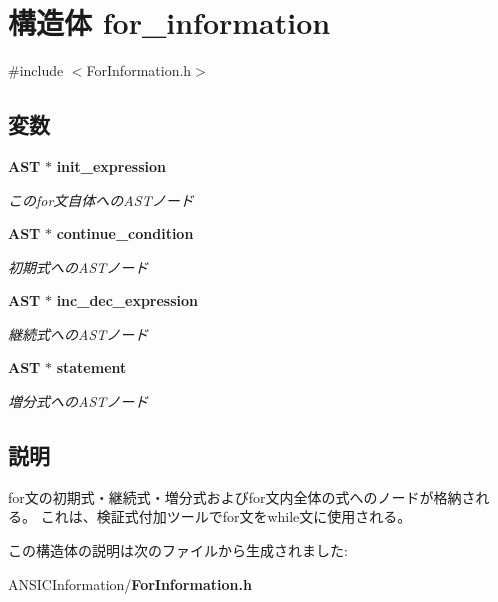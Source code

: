 \section{構造体 for\_\-information}
\label{structfor__information}


{\ttfamily \#include $<$ForInformation.h$>$}

\subsection*{変数}
\begin{DoxyCompactItemize}
\item 
{\bf AST} $\ast$ {\bf init\_\-expression}\label{structfor__information_a744fb3a7b36dfd65aafbc1a8e39c137d}

\begin{DoxyCompactList}\small\item\em このfor文自体へのASTノード \item\end{DoxyCompactList}\item 
{\bf AST} $\ast$ {\bf continue\_\-condition}\label{structfor__information_a6fdc047d1c19f69e884c929688bf70e6}

\begin{DoxyCompactList}\small\item\em 初期式へのASTノード \item\end{DoxyCompactList}\item 
{\bf AST} $\ast$ {\bf inc\_\-dec\_\-expression}\label{structfor__information_a694fedfacd9dab80421b098d5040f28d}

\begin{DoxyCompactList}\small\item\em 継続式へのASTノード \item\end{DoxyCompactList}\item 
{\bf AST} $\ast$ {\bf statement}\label{structfor__information_ae8f8608451c0048194d39fec93fbcf8b}

\begin{DoxyCompactList}\small\item\em 増分式へのASTノード \item\end{DoxyCompactList}\end{DoxyCompactItemize}


\subsection{説明}
for文の初期式・継続式・増分式およびfor文内全体の式へのノードが格納される。 これは、検証式付加ツールでfor文をwhile文に使用される。 

この構造体の説明は次のファイルから生成されました:\begin{DoxyCompactItemize}
\item 
ANSICInformation/{\bf ForInformation.h}\end{DoxyCompactItemize}
